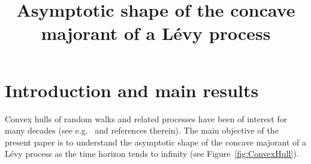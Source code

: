 \documentclass[AHL,Unicode,longabstracts,published]{cedram}
\title[Asymptotic shape of the concave majorant of a Lévy process]{Asymptotic shape of the concave majorant of a Lévy process}
\author[\initial{D.} \lastname{Bang}]{\firstname{David} \lastname{Bang}}
\author[\initial{J.} \lastname{Gonz\'alez C\'azares}]{\firstname{Jorge} \lastname{Gonz\'alez C\'azares}}
\author[\initial{A.} \lastname{Mijatovi\'c}]{\firstname{Aleksandar} \lastname{Mijatovi\'c}}
\newcommand\1{\mathds{1}}
\begin{document}
\maketitle


\section{Introduction and main results}\label{sec:intro}
Convex hulls of random walks and related processes have been of interest for many decades (see e.g.~\cite{RWpaper,MR2898714,MR3564216,MR3896868,MR2978134,randonfurling2020convex} and references therein). The main objective of the present paper is to understand the asymptotic shape of the concave majorant of a Lévy process as the time horizon tends to infinity (see Figure~\ref{fig:ConvexHull}).
\end{document}
